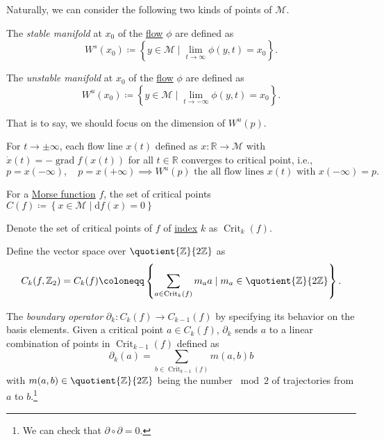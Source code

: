 Naturally, we can consider the following two kinds of points of \(\mathcal{M} \).

\begin{definition}\label{def:stable-manifold}
	The \emph{stable manifold} at \(x_0\) of the \hyperref[def:negative-gradient-flow]{flow} \(\phi \) are defined as
	\[
		W^s (x_0) \coloneqq \left\{ y\in \mathcal{M} \mid \lim_{t \to \infty} \phi (y, t) = x_0 \right\}.
	\]
\end{definition}

\begin{definition}\label{def:unstable-manifold}
	The \emph{unstable manifold} at \(x_0\) of the \hyperref[def:negative-gradient-flow]{flow} \(\phi \) are defined as
	\[
		W^u (x_0) \coloneqq \left\{ y\in \mathcal{M} \mid \lim_{t \to -\infty} \phi (y, t) = x_0 \right\}.
	\]
\end{definition}

That is to say, we should focus on the dimension of \(W^u(p)\).

\begin{intuition}
	For \(t \to \pm \infty \), each flow line \(x(t)\) defined as \(x\colon \mathbb{R} \to \mathcal{M} \) with \(\dot{x} (t) = -\mathop{\mathrm{grad}} f(x(t))\) for all \(t\in \mathbb{R} \) converges to critical point, i.e.,
	\[
		p = x(-\infty ), \quad
		p = x(+\infty )
		\implies W^u(p) \text{ the all flow lines } x(t) \text{ with } x(-\infty ) = p.
	\]
\end{intuition}

\begin{prev}
	For a \hyperref[def:Morse-function]{Morse function} \(f\), the set of critical points \(C(f) \coloneqq \left\{ x\in \mathcal{M} \mid \mathrm{d} f (x) = 0 \right\} \)
\end{prev}

\begin{notation}
	Denote the set of critical points of \(f\) of \hyperref[def:Morse-index]{index} \(k\) as \(\mathop{\mathrm{Crit}}\nolimits_{k}(f)\).
\end{notation}

\begin{definition}\label{def:Morse-complex}
	Define the vector space over \(\quotient{\mathbb{Z}}{2\mathbb{Z}} \) as
	\[
		C_k(f, \mathbb{Z} _2) = C_k(f) \coloneqq \left\{ \sum_{a \in \mathop{\mathrm{Crit}}\nolimits_{k}(f) } m_a a  \mid m_a \in \quotient{\mathbb{Z} }{2\mathbb{Z} } \right\}.
	\]
	\begin{definition}\label{def:boundary-operator}
		The \emph{boundary operator} \(\partial _k \colon C_k(f) \to C_{k-1}(f)\) by specifying its behavior on the basis elements. Given a critical point \(a\in C_k(f)\), \(\partial _k\) sends \(a\) to a linear combination of points in \(\mathop{\mathrm{Crit}}\nolimits_{k-1}(f) \) defined as
		\[
			\partial _k(a) = \sum_{b\in \mathop{\mathrm{Crit}}\nolimits_{k-1}(f) } m(a, b) b
		\]
		with \(m(a, b) \in \quotient{\mathbb{Z} }{2\mathbb{Z} } \) being the number \(\bmod 2\) of trajectories from \(a\) to \(b\).\footnote{We can check that \(\partial \circ \partial = 0\).}
	\end{definition}
\end{definition}

